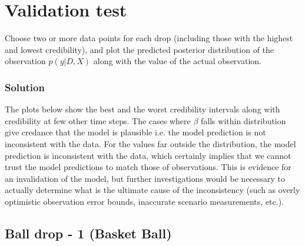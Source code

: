 \documentclass{article}
\begin{document}
\section{Validation test}

Choose two or more data points for each drop (including those with
the highest and lowest credibility), and plot the predicted posterior
distribution of the observation $p\left(y|D,X\right)$ along with
the value of the actual observation.


\subsubsection*{Solution}

The plots below show the best and the worst credibility intervals
along with credibility at few other time steps. The cases where $\beta$
falls within distribution give credance that the model is plausible \textendash{}
i.e. the model prediction is not inconsistent with the data. For the
values far outside the distribution, the model prediction is
inconsistent with the data, which certainly implies that we cannot trust
the model predictions to match those of observations. This is evidence
for an invalidation of the model, but further investigations would be
necessary to actually determine what is the ultimate cause of the
inconsistency (such as overly optimistic observation error bounds,
inaccurate scenario measurements, etc.).


\subsection{Ball drop - 1 (Basket Ball) }
\end{document}
